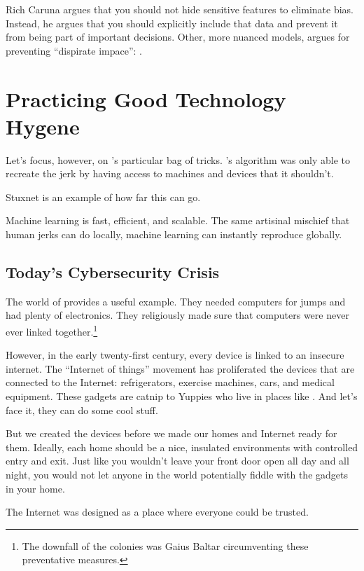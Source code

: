 Rich Caruna argues that you should not hide sensitive features to
eliminate bias.  Instead, he argues that you should explicitly include
that data and prevent it from being part of important decisions.
Other, more nuanced models, argues for preventing ``dispirate
impace'': .

\section{Practicing Good Technology Hygene}

Let's focus, however, on \energyJerk{}'s particular bag of tricks.
\energyCompany{}'s algorithm was only able to recreate the jerk by
having access to machines and devices that it shouldn't.

Stuxnet is an example of how far this can go.

Machine learning is fast, efficient, and scalable.  The same artisinal
mischief that human jerks can do locally, machine learning can
instantly reproduce globally.  

\subsection{Today's Cybersecurity Crisis}

The world of  provides a useful example.
They needed computers for jumps and had plenty of electronics.  They
religiously made sure that computers were never ever linked
together.\footnote{The downfall of the colonies was Gaius Baltar
  circumventing these preventative measures.}

However, in the early twenty-first century, every device is linked to
an insecure internet.  The ``Internet of things'' movement has
proliferated the devices that are connected to the Internet:
refrigerators, exercise machines, cars, and medical equipment.  These
gadgets are catnip to Yuppies who live in places like \crunchyCity{}.
And let's face it, they can do some cool stuff.

But we created the devices before we made our homes and Internet ready
for them.  Ideally, each home should be a nice, insulated environments
with controlled entry and exit.  Just like you wouldn't leave your
front door open all day and all night, you would not let anyone in the
world potentially fiddle with the gadgets in your home.  

The Internet was designed as a place where everyone could be trusted.

